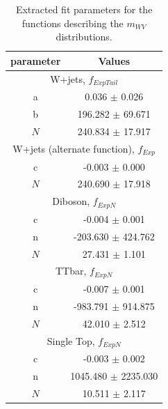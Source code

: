 \begin{table}[!htbp]
	\centering
	\begin{tabular}{||c | c||} 
	 \hline
	 parameter & Values \\
	 \hline \hline
	 \multicolumn{2}{|c|}{W+jets, $f_{ExpTail}$}\\
	 \hline
	 a 			&	0.036 $\pm$ 0.026\\
	 b 			&	196.282	$\pm$ 69.671\\
	 $N$ 		&	240.834 $\pm$ 17.917\\
	 \hline \hline
	 \multicolumn{2}{|c|}{W+jets (alternate function), $f_{Exp}$}\\
	 \hline
	 c 			&	-0.003 $\pm$ 0.000\\
	 $N$ 		&	240.690 $\pm$ 17.918\\
	 \hline \hline
	 \multicolumn{2}{|c|}{Diboson, $f_{ExpN}$}\\
	 \hline
	 c 			&	-0.004 $\pm$ 0.001\\
	 n 			&	-203.630 $\pm$ 424.762\\
	 $N$ 		&	27.431 $\pm$ 1.101\\
	 \hline \hline
	 \multicolumn{2}{|c|}{TTbar, $f_{ExpN}$}\\
	 \hline
	 c 			&	-0.007 $\pm$ 0.001\\
	 n 			&	-983.791 $\pm$ 914.875\\
	 $N$ 		&	42.010 $\pm$ 2.512\\
	 \hline \hline
	 \multicolumn{2}{|c|}{Single Top, $f_{ExpN}$}\\
	 \hline
	 c 			&	-0.003 $\pm$ 0.002\\
	 n 			&	1045.480 $\pm$ 2235.030\\
	 $N$ 		&	10.511 $\pm$ 2.117\\
	 \hline \hline
	\end{tabular}
 	\caption{Extracted fit parameters for the functions describing the $m_{WV}$ distributions.}
 	\label{Table:BackgroundEstimation_mWWFitPars}
\end{table}


